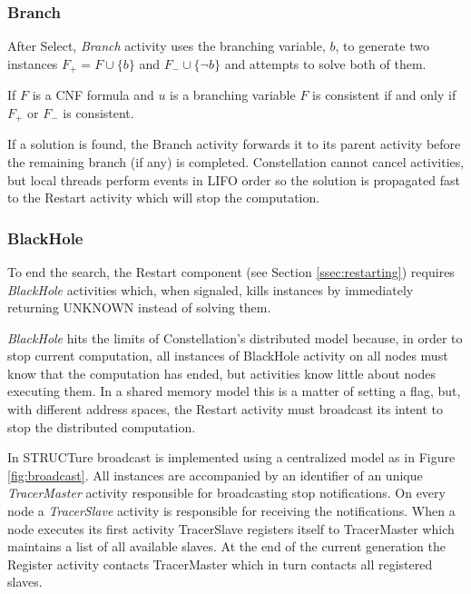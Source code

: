 \subsubsection{Branch}

After Select, \emph{Branch} activity uses the branching variable,
$b$, to generate two instances $F_+ = F \cup \{b\}$ and $F_- \cup
\{\neg b\}$ and attempts to solve both of them.

\begin{myprop}
  If $F$ is a CNF formula and $u$ is a branching variable
  $F$ is consistent if and only if $F_+$ or $F_-$ is consistent.
\end{myprop}

If a solution is found, the Branch activity forwards it to
its parent activity before the remaining branch (if any) is
completed. Constellation cannot cancel activities, but local threads
perform events in LIFO order so the solution is propagated fast to
the Restart activity which will stop the computation.


\subsubsection{BlackHole}
\label{sssec:blackhole}

To end the search, the Restart component (see Section
\ref{ssec:restarting}) requires \emph{BlackHole} activities which, when
signaled, kills instances by immediately returning \textsf{UNKNOWN}
instead of solving them.

\emph{BlackHole} hits the limits of Constellation's distributed
model because, in order to stop current computation, all instances of
BlackHole activity on all nodes must know that the computation has
ended, but activities know little about nodes executing them. In
a shared memory model this is a matter of setting a flag, but, with
different address spaces, the Restart activity must broadcast its
intent to stop the distributed computation.

In STRUCTure broadcast is implemented using a centralized model as
in Figure \ref{fig:broadcast}.  All instances are accompanied by an
identifier of an unique \emph{TracerMaster} activity responsible for
broadcasting stop notifications. On every node a \emph{TracerSlave}
activity is responsible for receiving the notifications. When a
node executes its first activity TracerSlave registers itself to
TracerMaster which maintains a list of all available slaves. At the
end of the current generation the Register activity contacts TracerMaster
which in turn contacts all registered slaves.

